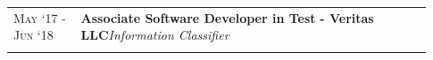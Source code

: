 \documentclass[a4paper,10pt]{extarticle} %
\begin{document}
{\begin{tabular}{>{\raggedright\arraybackslash}p{0.15\linewidth} | >{\raggedright\arraybackslash}p{0.78\linewidth}}
\textsc{May ‘17 - Jun ‘18} & \textbf{Associate Software Developer in Test} \textbf{ - Veritas LLC}\hfill\textit{Information Classifier}\\
\multicolumn{2}{c}{} \\

\end{tabular}

}
\end{document}
